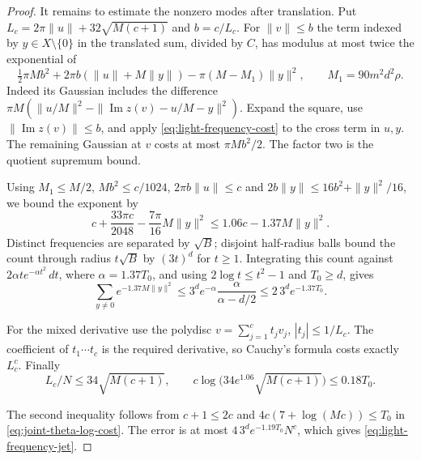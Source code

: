 \begin{proof}
It remains to estimate the nonzero modes after translation.
Put \(L_c=2\pi\|u\|+32\sqrt{M(c+1)}\) and \(b=c/L_c\).
For \(\|v\|\le b\) the term indexed by \(y\in X\setminus\{0\}\)
in the translated sum, divided by \(C\), has modulus at most
twice the exponential of
\[
 \tfrac12\pi Mb^2+2\pi b(\|u\|+M\|y\|)
               -\pi(M-M_1)\|y\|^2,\qquad
 M_1=90m^2d^2\rho .
\]
Indeed its Gaussian includes the difference
\(\pi M(\|u/M\|^2-\|\operatorname{Im}z(v)-u/M-y\|^2)\).
Expand the square, use \(\|\operatorname{Im}z(v)\|\le b\),
and apply \eqref{eq:light-frequency-cost} to the cross term
in \(u,y\). The remaining Gaussian at \(v\) costs at most
\(\pi Mb^2/2\). The factor two is the quotient supremum bound.

Using \(M_1\le M/2\), \(Mb^2\le c/1024\),
\(2\pi b\|u\|\le c\) and \(2b\|y\|\le16b^2+\|y\|^2/16\),
we bound the exponent by
\[
 c+\frac{33\pi c}{2048}-\frac{7\pi}{16}M\|y\|^2
       \le 1.06c-1.37M\|y\|^2 .
\]
Distinct frequencies are separated by \(\sqrt B\); disjoint
half-radius balls bound the count through radius \(t\sqrt B\)
by \((3t)^d\) for \(t\ge1\). Integrating this count against
\(2\alpha t e^{-\alpha t^2}\,dt\), where \(\alpha=1.37 T_0\),
and using \(2\log t\le t^2-1\) and \(T_0\ge d\), gives
\[
 \sum_{y\ne0}e^{-1.37M\|y\|^2}
   \le 3^d e^{-\alpha}\frac{\alpha}{\alpha-d/2}
   \le 2\,3^d e^{-1.37T_0}.
\]

For the mixed derivative use the polydisc
\(v=\sum_{j=1}^c t_jv_j\), \(|t_j|\le1/L_c\). The coefficient
of \(t_1\cdots t_c\) is the required derivative, so Cauchy's
formula costs exactly \(L_c^c\). Finally
\[
 L_c/N\le34\sqrt{M(c+1)},\qquad
 c\log\!\bigl(34e^{1.06}\sqrt{M(c+1)}\bigr)\le0.18T_0.
\]

The second inequality follows from \(c+1\le2c\) and
\(4c(7+\log(Mc))\le T_0\) in
\eqref{eq:joint-theta-log-cost}. The error is at most
\(4\,3^d e^{-1.19T_0}N^c\), which gives
\eqref{eq:light-frequency-jet}.
\end{proof}

